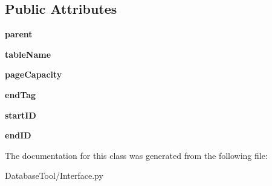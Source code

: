 \subsection*{Public Attributes}
\begin{DoxyCompactItemize}
\item 
\mbox{\label{classMIS_1_1DatabaseTool_1_1Interface_1_1Cormis__DataIterator__Interface_abb397c581f09448ed8427d2ffeaab0ea}} 
{\bfseries parent}
\item 
\mbox{\label{classMIS_1_1DatabaseTool_1_1Interface_1_1Cormis__DataIterator__Interface_ab1c4887bec992786304e27bb05332375}} 
{\bfseries table\+Name}
\item 
\mbox{\label{classMIS_1_1DatabaseTool_1_1Interface_1_1Cormis__DataIterator__Interface_a25e1ccf4713fa214bc02c971443657c1}} 
{\bfseries page\+Capacity}
\item 
\mbox{\label{classMIS_1_1DatabaseTool_1_1Interface_1_1Cormis__DataIterator__Interface_ab0c1b557affb8f209995bbaaeee01207}} 
{\bfseries end\+Tag}
\item 
\mbox{\label{classMIS_1_1DatabaseTool_1_1Interface_1_1Cormis__DataIterator__Interface_af67ab37adbc7ad6f5b359eda5cc12ceb}} 
{\bfseries start\+ID}
\item 
\mbox{\label{classMIS_1_1DatabaseTool_1_1Interface_1_1Cormis__DataIterator__Interface_a7d0a5c7c3ac89a06ec431f5495f69d86}} 
{\bfseries end\+ID}
\end{DoxyCompactItemize}


The documentation for this class was generated from the following file\+:\begin{DoxyCompactItemize}
\item 
Database\+Tool/Interface.\+py\end{DoxyCompactItemize}
